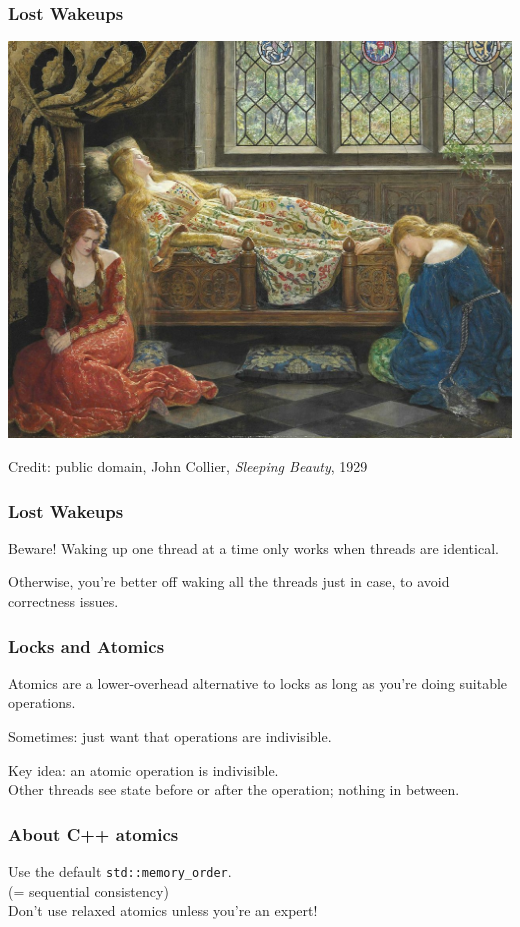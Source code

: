 \begin{frame}
\frametitle{Lost Wakeups}

\begin{center}
\includegraphics[width=.8\textwidth]{images/L08-sleeping-beauty.jpg}

Credit: public domain, John Collier, \emph{Sleeping Beauty}, 1929
\end{center}
\end{frame}

\begin{frame}
\frametitle{Lost Wakeups}


Beware! Waking up one thread at a time only works when threads are identical.

Otherwise, you're better off waking all the threads just in case, to avoid correctness issues.

\end{frame}

\begin{frame}
\frametitle{Locks and Atomics}

 Atomics are a lower-overhead alternative to
locks as long as you're doing suitable operations. 

Sometimes: just want that operations are indivisible.

Key idea: an \alert{atomic operation} is indivisible.\\
\quad Other threads see state before or after the operation; nothing in between.

\end{frame}


\begin{frame}[fragile]
  \frametitle{About C++ atomics}

\vspace*{-2em}

\Large
    Use the default {\tt std::memory\_order}.\\
    (= sequential consistency)\\[1em]

    \alert{Don't use relaxed atomics unless you're an expert!}\\[1em]
    
    
\end{frame}




